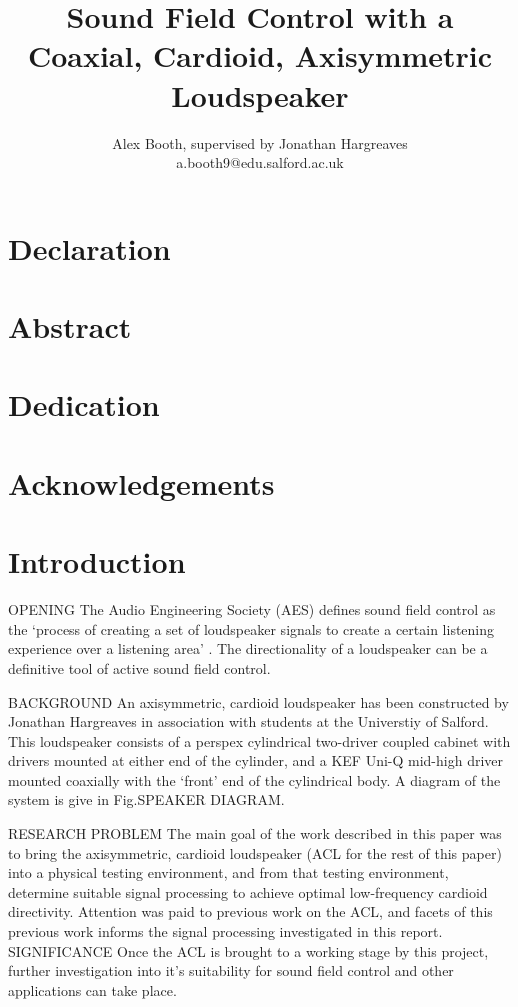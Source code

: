 \documentclass{report}
\title{Sound Field Control with a Coaxial, Cardioid, Axisymmetric Loudspeaker}
\author{Alex Booth, supervised by Jonathan Hargreaves\\ a.booth9@edu.salford.ac.uk}
\begin{document}
\maketitle

\chapter*{Declaration}

\chapter*{Abstract}
    \textit{}

\chapter*{Dedication}



\chapter*{Acknowledgements}

\tableofcontents
\newpage

\chapter{Introduction}
    OPENING
    The Audio Engineering Society (AES) defines sound field control as the `process of creating a set of loudspeaker signals to create a certain listening experience over a listening area' \cite{AESsoundfieldcontrol}.
    The directionality of a loudspeaker can be a definitive tool of active sound field control.

    BACKGROUND
    An axisymmetric, cardioid loudspeaker has been constructed by Jonathan Hargreaves in association with students at the Universtiy of Salford.
    This loudspeaker consists of a perspex cylindrical two-driver coupled cabinet with drivers mounted at either end of the cylinder, and a KEF Uni-Q mid-high driver mounted coaxially with the `front' end of the cylindrical body.
    A diagram of the system is give in Fig.SPEAKER DIAGRAM.


    RESEARCH PROBLEM
    The main goal of the work described in this paper was to bring the axisymmetric, cardioid loudspeaker (ACL for the rest of this paper) into a physical testing environment, and from that testing environment, determine suitable signal processing to achieve optimal low-frequency cardioid directivity.
    Attention was paid to previous work on the ACL, and facets of this previous work informs the signal processing investigated in this report.
    SIGNIFICANCE
    Once the ACL is brought to a working stage by this project, further investigation into it's suitability for sound field control and other applications can take place.
\end{document}
